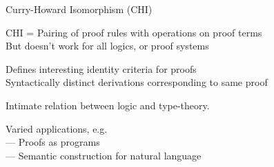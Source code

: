\begin{hslide}{Curry-Howard Isomorphism (CHI)}

CHI = Pairing of proof rules with operations on proof terms\\
{\small \hspace*{1em} But doesn't work for all logics, or proof
systems}

Defines interesting identity criteria for proofs\\
{\small \hspace*{1em} Syntactically distinct derivations corresponding
to same proof}

Intimate relation between logic and type-theory.

Varied applications, e.g.\\
{\small \hspace*{1em} --- Proofs as programs}\\
{\small \hspace*{1em} --- Semantic construction for natural language}
\end{hslide}


